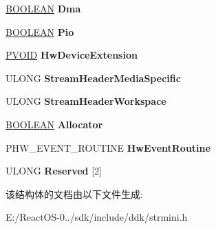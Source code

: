 \begin{DoxyCompactItemize}
\item 
\mbox{\label{struct___h_w___s_t_r_e_a_m___o_b_j_e_c_t_ad65b7cc3292ef396bceb44f2d3fbfd22}} 
\hyperlink{_processor_bind_8h_a112e3146cb38b6ee95e64d85842e380a}{B\+O\+O\+L\+E\+AN} {\bfseries Dma}
\item 
\mbox{\label{struct___h_w___s_t_r_e_a_m___o_b_j_e_c_t_a67385710edad97509032d60afeace33f}} 
\hyperlink{_processor_bind_8h_a112e3146cb38b6ee95e64d85842e380a}{B\+O\+O\+L\+E\+AN} {\bfseries Pio}
\item 
\mbox{\label{struct___h_w___s_t_r_e_a_m___o_b_j_e_c_t_aea1216816f25298043dbc172591e2e9d}} 
\hyperlink{interfacevoid}{P\+V\+O\+ID} {\bfseries Hw\+Device\+Extension}
\item 
\mbox{\label{struct___h_w___s_t_r_e_a_m___o_b_j_e_c_t_ae6e2b6f949046ccaeada39b3ca4d9ef2}} 
U\+L\+O\+NG {\bfseries Stream\+Header\+Media\+Specific}
\item 
\mbox{\label{struct___h_w___s_t_r_e_a_m___o_b_j_e_c_t_af049e69430cb1306f354d2c47e7c2fa9}} 
U\+L\+O\+NG {\bfseries Stream\+Header\+Workspace}
\item 
\mbox{\label{struct___h_w___s_t_r_e_a_m___o_b_j_e_c_t_aeb5b9121edce526b891b01cf20a64472}} 
\hyperlink{_processor_bind_8h_a112e3146cb38b6ee95e64d85842e380a}{B\+O\+O\+L\+E\+AN} {\bfseries Allocator}
\item 
\mbox{\label{struct___h_w___s_t_r_e_a_m___o_b_j_e_c_t_a24ae251c5083088a7b670c86357cc398}} 
P\+H\+W\+\_\+\+E\+V\+E\+N\+T\+\_\+\+R\+O\+U\+T\+I\+NE {\bfseries Hw\+Event\+Routine}
\item 
\mbox{\label{struct___h_w___s_t_r_e_a_m___o_b_j_e_c_t_a203a685d559658516785fa3130c703da}} 
U\+L\+O\+NG {\bfseries Reserved} \mbox{[}2\mbox{]}
\end{DoxyCompactItemize}


该结构体的文档由以下文件生成\+:\begin{DoxyCompactItemize}
\item 
E\+:/\+React\+O\+S-\/0../sdk/include/ddk/strmini.\+h\end{DoxyCompactItemize}
